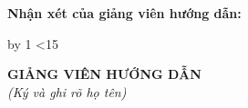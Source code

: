 
\noindent\textbf{Nhận xét của giảng viên hướng dẫn:}

\begingroup
{}
\newcount\dotlines
{}
\loop
  \noindent\makebox[\linewidth]{\dotfill}\par
  \advance\dotlines by 1
\ifnum\dotlines<15 \repeat
\endgroup

\vspace{0.8cm}
\begin{flushright}
  \begin{minipage}{7cm}
    \centering
    \textbf{GIẢNG VIÊN HƯỚNG DẪN}\\
    \textit{(Ký và ghi rõ họ tên)}
  \end{minipage}
\end{flushright}
